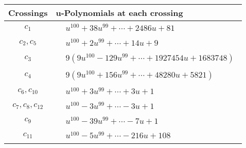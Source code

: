 \documentclass[1p]{elsarticle_modified}
\theoremstyle{definition}
\begin{document}
\begin{tabular}{m{50pt}|m{274pt}}
Crossings & \hspace{64pt}u-Polynomials at each crossing \\
\hline $$\begin{aligned}c_{1}\end{aligned}$$&$\begin{aligned}
&u^{100}+38 u^{99}+\cdots+2486 u+81
\end{aligned}$\\
\hline $$\begin{aligned}c_{2},c_{5}\end{aligned}$$&$\begin{aligned}
&u^{100}+2 u^{99}+\cdots+14 u+9
\end{aligned}$\\
\hline $$\begin{aligned}c_{3}\end{aligned}$$&$\begin{aligned}
&9(9 u^{100}-129 u^{99}+\cdots+1927454 u+1683748)
\end{aligned}$\\
\hline $$\begin{aligned}c_{4}\end{aligned}$$&$\begin{aligned}
&9(9 u^{100}+156 u^{99}+\cdots+48280 u+5821)
\end{aligned}$\\
\hline $$\begin{aligned}c_{6},c_{10}\end{aligned}$$&$\begin{aligned}
&u^{100}+3 u^{99}+\cdots+3 u+1
\end{aligned}$\\
\hline $$\begin{aligned}c_{7},c_{8},c_{12}\end{aligned}$$&$\begin{aligned}
&u^{100}-3 u^{99}+\cdots-3 u+1
\end{aligned}$\\
\hline $$\begin{aligned}c_{9}\end{aligned}$$&$\begin{aligned}
&u^{100}-39 u^{99}+\cdots-7 u+1
\end{aligned}$\\
\hline $$\begin{aligned}c_{11}\end{aligned}$$&$\begin{aligned}
&u^{100}-5 u^{99}+\cdots-216 u+108
\end{aligned}$\\
\hline
\end{tabular}\\~\\
\end{document}
